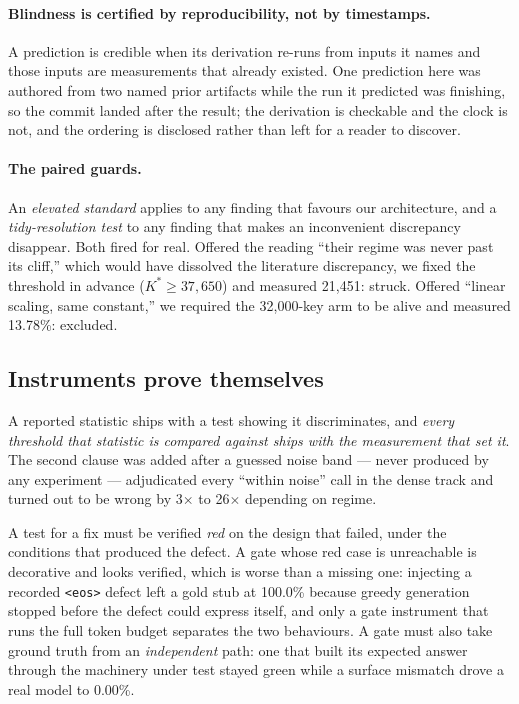 \paragraph{Blindness is certified by reproducibility, not by timestamps.} A prediction is credible
when its derivation re-runs from inputs it names and those inputs are measurements that already
existed. One prediction here was authored from two named prior artifacts while the run it predicted
was finishing, so the commit landed after the result; the derivation is checkable and the clock is
not, and the ordering is disclosed rather than left for a reader to discover.

\paragraph{The paired guards.} An \emph{elevated standard} applies to any finding that favours our
architecture, and a \emph{tidy-resolution test} to any finding that makes an inconvenient
discrepancy disappear. Both fired for real. Offered the reading ``their regime was never past its
cliff,'' which would have dissolved the literature discrepancy, we fixed the threshold in advance
($K^* \ge 37{,}650$) and measured 21{,}451: struck.
Offered ``linear scaling, same constant,'' we required the 32{,}000-key arm to be alive and measured
13.78\%: excluded.

\subsection{Instruments prove themselves}

A reported statistic ships with a test showing it discriminates, and \emph{every threshold that
statistic is compared against ships with the measurement that set it}. The second clause was added
after a guessed noise band --- never produced by any experiment --- adjudicated every
``within noise'' call in the dense track and turned out to be wrong by 3$\times$ to 26$\times$
depending on regime.

A test for a fix must be verified \emph{red} on the design that failed, under the conditions that
produced the defect. A gate whose red case is unreachable is decorative and looks verified, which is
worse than a missing one: injecting a recorded \texttt{<eos>} defect left a gold stub at 100.0\%
because greedy generation stopped before the defect could express itself, and only a gate instrument
that runs the full token budget separates the two behaviours.
A gate must also take ground truth from an \emph{independent} path: one that built its expected
answer through the machinery under test stayed green while a surface mismatch drove a real model to
0.00\%.
